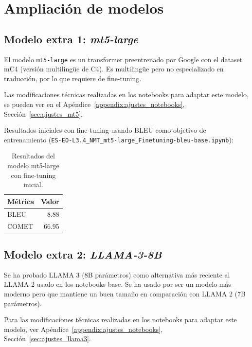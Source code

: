 \documentclass[11pt,spanish,listoffigures,listoftables]{tfgetsinf}
\begin{document}
\chapter{Ampliación de modelos}

\section{Modelo extra 1: \textit{mt5-large}}
El modelo \texttt{mt5-large} \cite{google-2024-mt5} es un transformer preentrenado por Google con el dataset mC4 \cite{raffel-etal-2019-c4} (versión multilingüe de C4). Es multilingüe pero no especializado en traducción, por lo que requiere de fine-tuning.

Las modificaciones técnicas realizadas en los notebooks para adaptar este modelo, se pueden ver en el Apéndice~\ref{appendix:ajustes_notebooks}, Sección~\ref{sec:ajustes_mt5}.

Resultados iniciales con fine-tuning usando BLEU como objetivo de entrenamiento (\texttt{ES-EO-L3.4\_NMT\_mt5-large\_Finetuning-bleu-base.ipynb}): 

\begin{table}[H]
\centering
\begin{tabular}{lr}
	\toprule
	\textbf{Métrica} & \textbf{Valor} \\
	\midrule
	BLEU & 8.88 \\
	COMET & 66.95 \\
	\bottomrule
\end{tabular}
\caption{Resultados del modelo mt5-large con fine-tuning inicial.}
\label{tab:mt5_baseline}
\end{table}

\section{Modelo extra 2: \textit{LLAMA-3-8B}}
Se ha probado LLAMA 3 (8B parámetros) como alternativa más reciente al LLAMA 2 usado en los notebooks base. Se ha usado por ser un modelo más moderno pero que mantiene un buen tamaño en comparación con LLAMA 2 (7B parámetros).

Para las modificaciones técnicas realizadas en los notebooks para adaptar este modelo, ver Apéndice~\ref{appendix:ajustes_notebooks}, Sección~\ref{sec:ajustes_llama3}.
\end{document}
